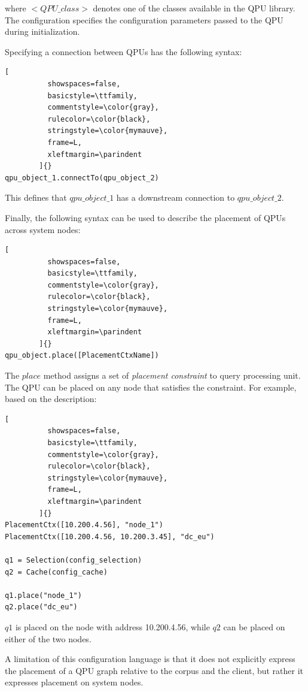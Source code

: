 \noindent
where $<QPU\_class>$ denotes one of the classes available in the QPU library.
The configuration specifies the configuration parameters passed to the QPU during initialization.

\medskip
\noindent
Specifying a connection between QPUs has the following syntax:
\begin{lstlisting}[
          showspaces=false,
          basicstyle=\ttfamily,
          commentstyle=\color{gray},
          rulecolor=\color{black},
          stringstyle=\color{mymauve},
          frame=L,
          xleftmargin=\parindent
        ]{}
qpu_object_1.connectTo(qpu_object_2)
\end{lstlisting}

\noindent
This defines that $qpu\_object\_1$ has a downstream connection to $qpu\_object\_2$.

\medskip
\noindent
Finally, the following syntax can be used to describe the placement of QPUs across system nodes:

\begin{lstlisting}[
          showspaces=false,
          basicstyle=\ttfamily,
          commentstyle=\color{gray},
          rulecolor=\color{black},
          stringstyle=\color{mymauve},
          frame=L,
          xleftmargin=\parindent
        ]{}
qpu_object.place([PlacementCtxName])
\end{lstlisting}

\noindent
The $place$ method assigns a set of \textit{placement constraint} to query processing unit.
The QPU can be placed on any node that satisfies the constraint.
For example, based on the description:
\begin{lstlisting}[
          showspaces=false,
          basicstyle=\ttfamily,
          commentstyle=\color{gray},
          rulecolor=\color{black},
          stringstyle=\color{mymauve},
          frame=L,
          xleftmargin=\parindent
        ]{}
PlacementCtx([10.200.4.56], "node_1")
PlacementCtx([10.200.4.56, 10.200.3.45], "dc_eu")

q1 = Selection(config_selection)
q2 = Cache(config_cache)

q1.place("node_1")
q2.place("dc_eu")
\end{lstlisting}

\noindent
$q1$ is placed on the node with address 10.200.4.56,
while $q2$ can be placed on either of the two nodes.

\bigskip
\noindent

A limitation of this configuration language is that it does not explicitly express the placement of a QPU graph
relative to the corpus and the client,
but rather it expresses placement on system nodes.


